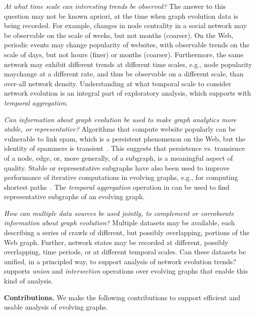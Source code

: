 {\em At what time scale can interesting trends be observed?} The
answer to this question may not be known apriori, at the time when
graph evolution data is being recorded.  For example, changes in node
centrality in a social network may be observable on the scale of
weeks, but not months (coarser).  On the Web, periodic events may
change popularity of websites, with observable trends on the scale of
days, but not hours (finer) or months (coarser).  Furthermore, the
same network may exhibit different trends at different time scales,
e.g., node popularity maychange at a different rate, and thus be
observable on a different scale, than over-all network density.
Understanding at what temporal scale to consider network evolution is
an integral part of exploratory analysis, which \ql supports with {\em
  temporal aggregation}.

{\em Can information about graph evolution be used to make graph
  analytics more stable, or representative?}  Algorithms that compute
website popularly can be vulnerable to link spam, which is a
persistent phenomenon on the Web, but the identity of spammers is
transient~\cite{DBLP:conf/cikm/YangQZGL07}.  This suggests that
persistence vs. transience of a node, edge, or, more generally, of a
subgraph, is a meaningful aspect of quality.  Stable or representative
subgraphs have also been used to improve performance of iterative
computations in evolving graphs, e.g., for computing shortest
paths~\cite{Ren2011}.  The {\em temporal aggregation} operation in \ql
{}can be used to find
representative subgraphs of an evolving graph.

{\em How can multiple data sources be used jointly, to complement or
  corroborate information about graph evolution?}  Multiple datasets may be available, each describing a
series of crawls of different, but possibly overlapping, portions of
the Web graph.  Further, network states may be recorded at different,
possibly overlapping, time periods, or at different temporal scales.
Can these datasets be unified, in a principled way, to support
analysis of network evolution trends?  \ql
supports {\em union} and {\em intersection} operations over evolving
graphs that enable this kind of analysis.

{\bf Contributions.} We make the following contributions to support
efficient and usable analysis of evolving graphs.

